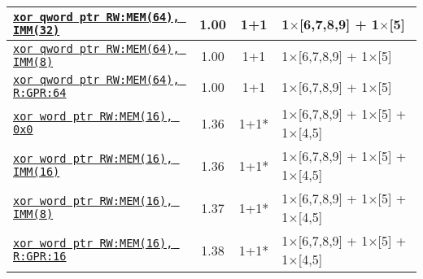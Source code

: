 \documentclass[a4paper,english,fontsize=9]{scrartcl}
\begin{document}
\begin{longtable}{p{}ccL{.25\textwidth}}
  \midrule
  \texttt{\href{https://felixcloutier.com/x86/XOR.html}{xor qword ptr RW:MEM(64), IMM(32)}} & 1.00 & 1+1 & 1\(\times\)[6,7,8,9] + 1\(\times\)[5] \\
  \midrule
  \texttt{\href{https://felixcloutier.com/x86/XOR.html}{xor qword ptr RW:MEM(64), IMM(8)}} & 1.00 & 1+1 & 1\(\times\)[6,7,8,9] + 1\(\times\)[5] \\
  \midrule
  \texttt{\href{https://felixcloutier.com/x86/XOR.html}{xor qword ptr RW:MEM(64), R:GPR:64}} & 1.00 & 1+1 & 1\(\times\)[6,7,8,9] + 1\(\times\)[5] \\
  \midrule
  \texttt{\href{https://felixcloutier.com/x86/XOR.html}{xor word ptr RW:MEM(16), 0x0}} & 1.36 & 1+1* & 1\(\times\)[6,7,8,9] + 1\(\times\)[5] + 1\(\times\)[4,5] \\
  \midrule
  \texttt{\href{https://felixcloutier.com/x86/XOR.html}{xor word ptr RW:MEM(16), IMM(16)}} & 1.36 & 1+1* & 1\(\times\)[6,7,8,9] + 1\(\times\)[5] + 1\(\times\)[4,5] \\
  \midrule
  \texttt{\href{https://felixcloutier.com/x86/XOR.html}{xor word ptr RW:MEM(16), IMM(8)}} & 1.37 & 1+1* & 1\(\times\)[6,7,8,9] + 1\(\times\)[5] + 1\(\times\)[4,5] \\
  \midrule
  \texttt{\href{https://felixcloutier.com/x86/XOR.html}{xor word ptr RW:MEM(16), R:GPR:16}} & 1.38 & 1+1* & 1\(\times\)[6,7,8,9] + 1\(\times\)[5] + 1\(\times\)[4,5] \\

  \bottomrule
\end{longtable}
\end{document}
